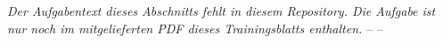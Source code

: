 %
{
	\textit{Der Aufgabentext dieses Abschnitts fehlt in diesem Repository.
	Die Aufgabe ist nur noch im mitgelieferten PDF dieses Trainingsblatts
	enthalten.}
}{
	\itemf --
}{
	\itemf --
}
